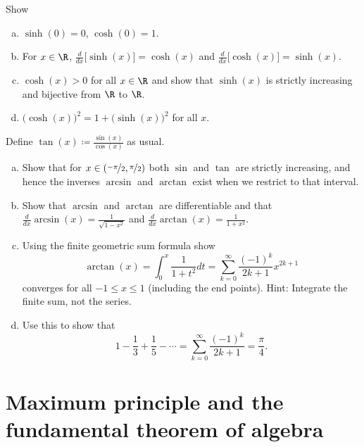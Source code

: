 \begin{exercise}
Show
\begin{enumerate}[a)]
\item
$\sinh(0) = 0$, $\cosh(0) = 1$.
\item
For $x \in \R$,
$\frac{d}{dx} \bigl[ \sinh(x) \bigr] = \cosh(x)$ and
$\frac{d}{dx} \bigl[ \cosh(x) \bigr] = \sinh(x)$.
\item
$\cosh(x) > 0$ for all $x \in \R$ and show that
$\sinh(x)$ is strictly increasing and bijective
from $\R$ to $\R$.
\item
${\bigl(\cosh(x)\bigr)}^2 = 1 + {\bigl(\sinh(x)\bigr)}^2$ for all
$x$.
\end{enumerate}
\end{exercise}

\begin{exercise}
Define $\tan(x) \coloneqq \frac{\sin(x)}{\cos(x)}$ as usual.
\begin{enumerate}[a)]
\item
Show that for $x \in (\nicefrac{-\pi}{2},\nicefrac{\pi}{2})$
both $\sin$ and $\tan$ are strictly increasing, and hence
the inverses $\arcsin$
and $\arctan$ exist when we restrict to that interval.
\item
Show that $\arcsin$ and $\arctan$ are differentiable
and
that
$\frac{d}{dx} \arcsin(x) = \frac{1}{\sqrt{1-x^2}}$ and
$\frac{d}{dx} \arctan(x) = \frac{1}{1+x^2}$.
\item
Using the finite geometric sum formula show
\begin{equation*}
\arctan(x) = \int_0^x \frac{1}{1+t^2} dt
=
\sum_{k=0}^\infty \frac{{(-1)}^k}{2k+1} x^{2k+1}
\end{equation*}
converges for all $-1 \leq x \leq 1$ (including the end points).
Hint: Integrate the finite sum, not the series.
\item
Use this to show that
\begin{equation*}
1 - \frac{1}{3} + \frac{1}{5} - \cdots
=
\sum_{k=0}^\infty \frac{{(-1)}^k}{2k+1}
=
\frac{\pi}{4} .
\end{equation*}
\end{enumerate}
\end{exercise}


\sectionnewpage
\section{Maximum principle and the fundamental theorem of algebra}
\label{sec:fundalgeb}

